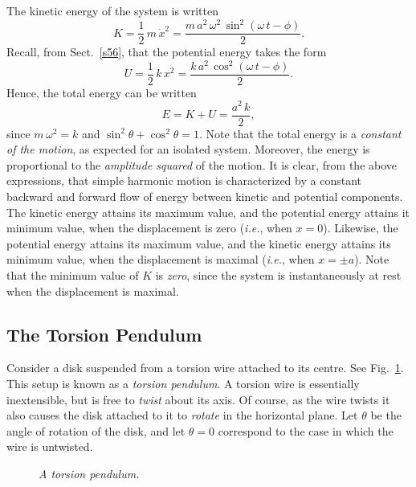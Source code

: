 The kinetic energy of the system is written
\begin{equation}
K = \frac{1}{2}\,m\,\dot{x}^2 = \frac{m\,a^2\,\omega^2\,\sin^2(\omega\,t-\phi)}{2}.
\end{equation}
Recall, from Sect.~\ref{s56}, that the potential energy takes the form
\begin{equation}
U = \frac{1}{2}\,k\,x^2= \frac{k\,a^2\,\cos^2(\omega\,t-\phi)}{2}.
\end{equation}
Hence, the total energy can be written
\begin{equation}
E = K + U = \frac{a^2\,k}{2},
\end{equation}
since $m\,\omega^2 = k$ and $\sin^2\theta+\cos^2\theta = 1$. Note that the
total energy is a {\em constant of the motion}, as expected for an isolated system. Moreover,
the energy is proportional to the {\em amplitude squared}\/ of the motion.
It is clear, from the above expressions, that simple harmonic motion is characterized
by a constant backward and forward flow of energy between kinetic and potential components.
The kinetic energy attains its maximum value, and the potential energy attains
it minimum value,  when the displacement is zero ({\em i.e.}, when $x=0$). Likewise,
the potential energy attains its maximum value, and the kinetic energy attains
its minimum value, when the displacement is maximal ({\em i.e.}, when $x=\pm a$). 
Note that the minimum value of $K$ is {\em zero}, since the system is instantaneously at rest
when the displacement is maximal.

\subsection{The Torsion Pendulum}
Consider a disk suspended from a torsion wire attached to its centre. See Fig.~\ref{f97}.  This setup is known as a {\em torsion
pendulum}.
A torsion wire is essentially inextensible, but is free to {\em twist} about its axis.
Of course, as the wire twists it also causes the disk attached to it to {\em rotate} in the horizontal
plane. Let $\theta$ be the angle of rotation of the disk, and let $\theta=0$
correspond to the case in which the wire is untwisted.

\begin{figure}
\epsfysize=2in
\centerline{}
\caption{\em A torsion pendulum.}\label{f97}  
\end{figure}

